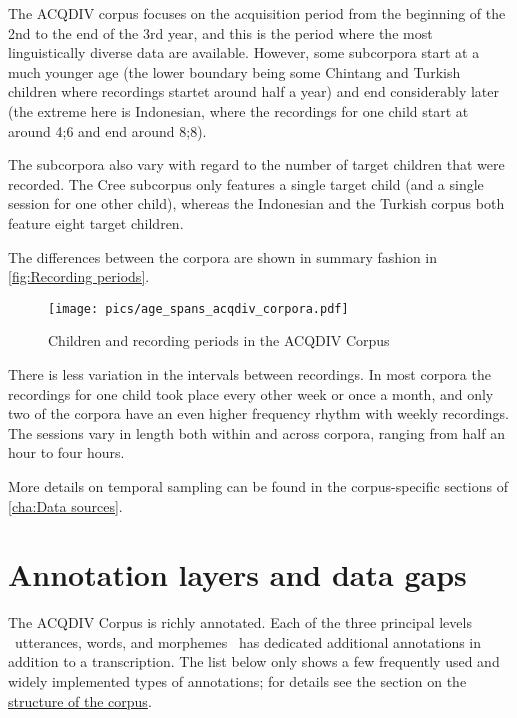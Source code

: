 \documentclass[a4paper, 11pt]{book}
\begin{document}
The ACQDIV corpus focuses on the acquisition period from the beginning of the 2nd to the end of the 3rd year, and this is the period where the most linguistically diverse data are available. However, some subcorpora start at a much younger age (the lower boundary being some Chintang and Turkish children where recordings startet around half a year) and end considerably later (the extreme here is Indonesian, where the recordings for one child start at around 4;6 and end around 8;8). 

The subcorpora also vary with regard to the number of target children that were recorded. The Cree subcorpus only features a single target child (and a single session for one other child), whereas the Indonesian and the Turkish corpus both feature eight target children. 

The differences between the corpora are shown in summary fashion in \autoref{fig:Recording periods}. 

\begin{figure}
	\centering
	\texttt{[image: pics/age\_spans\_acqdiv\_corpora.pdf]}
	\caption{Children and recording periods in the ACQDIV Corpus}
	\label{fig:Recording periods}
\end{figure}

There is less variation in the intervals between recordings. In most corpora the recordings for one child took place every other week or once a month, and only two of the corpora have an even higher frequency rhythm with weekly recordings. The sessions vary in length both within and across corpora, ranging from half an hour to four hours. 

More details on temporal sampling can be found in the corpus-specific sections of \autoref{cha:Data sources}. 

\section{Annotation layers and data gaps}
\label{sec:Annotation layers and data gaps}

The ACQDIV Corpus is richly annotated. Each of the three principal levels \textendash\ utterances, words, and morphemes \textendash\ has dedicated additional annotations in addition to a transcription. The list below only shows a few frequently used and widely implemented types of annotations; for details see the section on the \hyperref[sec:Structure of the corpus]{structure of the corpus}. 
\end{document}
